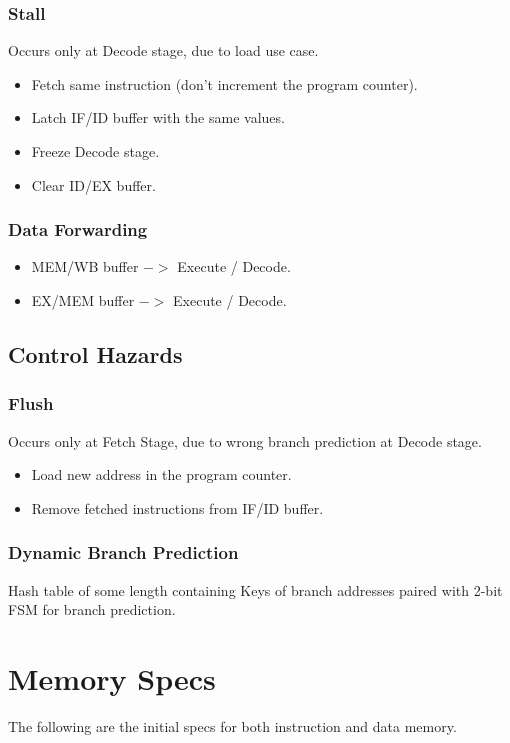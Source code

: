 \documentclass[12pt]{report}
\begin{document}
\subsubsection{Stall}
Occurs only at Decode stage, due to load use case.
\begin{itemize}
    \item Fetch same instruction (don't increment the program counter).
    \item Latch IF/ID buffer with the same values.
    \item Freeze Decode stage.
    \item Clear ID/EX buffer.
\end{itemize}

\subsubsection{Data Forwarding}
\begin{itemize}
    \item MEM/WB buffer $->$ Execute / Decode.
    \item EX/MEM buffer $->$ Execute / Decode.
\end{itemize}

\subsection{Control Hazards}

\subsubsection{Flush}
Occurs only at Fetch Stage, due to wrong branch prediction at Decode stage.
\begin{itemize}
    \item Load new address in the program counter.
    \item Remove fetched instructions from IF/ID buffer.
\end{itemize}

\subsubsection{Dynamic Branch Prediction}
Hash table of some length containing Keys of branch addresses paired with 2-bit FSM for branch prediction.

\section{Memory Specs}
The following are the initial specs for both instruction and data memory.
\end{document}
